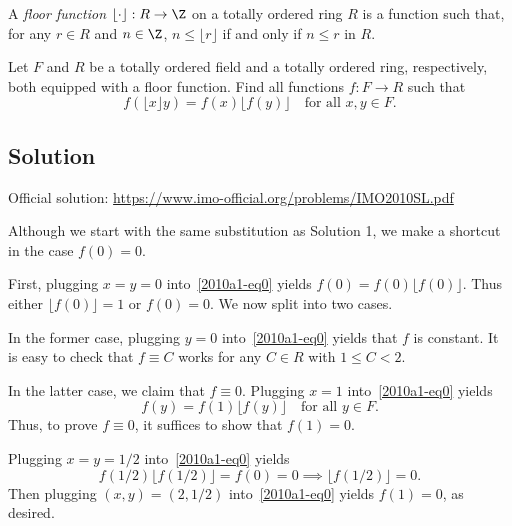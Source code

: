 A \emph{floor function} $\lfloor \cdot \rfloor : R \to \Z$ on a totally ordered ring $R$ is a function such that, for any $r \in R$ and $n \in \Z$, $n \leq \lfloor r \rfloor$ if and only if $n \leq r$ in $R$.

Let $F$ and $R$ be a totally ordered field and a totally ordered ring, respectively, both equipped with a floor function.
Find all functions $f : F \to R$ such that
\[ f(\lfloor x \rfloor y) = f(x) \lfloor f(y) \rfloor \quad \text{for all } x, y \in F. \tag{*}\label{2010a1-eq0} \]



\subsection*{Solution}

Official solution: \url{https://www.imo-official.org/problems/IMO2010SL.pdf}

Although we start with the same substitution as Solution 1, we make a shortcut in the case $f(0) = 0$.

First, plugging $x = y = 0$ into~\eqref{2010a1-eq0} yields $f(0) = f(0) \lfloor f(0) \rfloor$.
Thus either $\lfloor f(0) \rfloor = 1$ or $f(0) = 0$.
We now split into two cases.

In the former case, plugging $y = 0$ into~\eqref{2010a1-eq0} yields that $f$ is constant.
It is easy to check that $f \equiv C$ works for any $C \in R$ with $1 \leq C < 2$.

In the latter case, we claim that $f \equiv 0$.
Plugging $x = 1$ into~\eqref{2010a1-eq0} yields
\[ f(y) = f(1) \lfloor f(y) \rfloor \quad \text{for all } y \in F. \]
Thus, to prove $f \equiv 0$, it suffices to show that $f(1) = 0$.

Plugging $x = y = 1/2$ into~\eqref{2010a1-eq0} yields
\[ f(1/2) \lfloor f(1/2) \rfloor = f(0) = 0 \implies \lfloor f(1/2) \rfloor = 0. \]
Then plugging $(x, y) = (2, 1/2)$ into~\eqref{2010a1-eq0} yields $f(1) = 0$, as desired.
